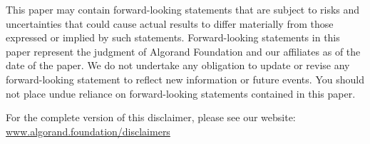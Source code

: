 \documentclass[11pt,a4paper]{article}
\begin{document}
This paper may contain forward-looking statements that are subject to risks and
uncertainties that could cause actual results to differ materially from those expressed
or implied by such statements. Forward-looking statements in this paper represent the
judgment of Algorand Foundation and our affiliates as of the date of the paper. We
do not undertake any obligation to update or revise any forward-looking statement
to reflect new information or future events. You should not place undue reliance on
forward-looking statements contained in this paper.

For the complete version of this disclaimer, please see our website:
\href{https://www.algorand.foundation/disclaimers}{www.algorand.foundation/disclaimers}

\pagebreak
\end{document}
